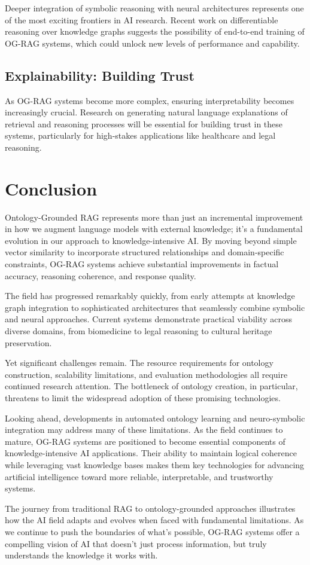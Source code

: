 Deeper integration of symbolic reasoning with neural architectures represents one of the most exciting frontiers in AI research. Recent work on differentiable reasoning over knowledge graphs suggests the possibility of end-to-end training of OG-RAG systems, which could unlock new levels of performance and capability.

\subsection{Explainability: Building Trust}

As OG-RAG systems become more complex, ensuring interpretability becomes increasingly crucial. Research on generating natural language explanations of retrieval and reasoning processes will be essential for building trust in these systems, particularly for high-stakes applications like healthcare and legal reasoning.

\section{Conclusion}

Ontology-Grounded RAG represents more than just an incremental improvement in how we augment language models with external knowledge; it's a fundamental evolution in our approach to knowledge-intensive AI. By moving beyond simple vector similarity to incorporate structured relationships and domain-specific constraints, OG-RAG systems achieve substantial improvements in factual accuracy, reasoning coherence, and response quality.

The field has progressed remarkably quickly, from early attempts at knowledge graph integration to sophisticated architectures that seamlessly combine symbolic and neural approaches. Current systems demonstrate practical viability across diverse domains, from biomedicine to legal reasoning to cultural heritage preservation.

Yet significant challenges remain. The resource requirements for ontology construction, scalability limitations, and evaluation methodologies all require continued research attention. The bottleneck of ontology creation, in particular, threatens to limit the widespread adoption of these promising technologies.

Looking ahead, developments in automated ontology learning and neuro-symbolic integration may address many of these limitations. As the field continues to mature, OG-RAG systems are positioned to become essential components of knowledge-intensive AI applications. Their ability to maintain logical coherence while leveraging vast knowledge bases makes them key technologies for advancing artificial intelligence toward more reliable, interpretable, and trustworthy systems.

The journey from traditional RAG to ontology-grounded approaches illustrates how the AI field adapts and evolves when faced with fundamental limitations. As we continue to push the boundaries of what's possible, OG-RAG systems offer a compelling vision of AI that doesn't just process information, but truly understands the knowledge it works with.
